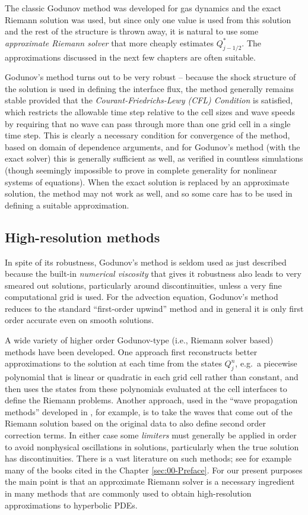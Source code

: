 \documentclass{SIAMbook2016}
\begin{document}
The classic Godunov method was developed for gas dynamics and the exact
Riemann solution was used, but since only one value is used from this
solution and the rest of the structure is thrown away, it is natural to
use some \emph{approximate Riemann solver} that more cheaply estimates
\(Q_{j-1/2}^*\). The approximations discussed in the next few chapters
are often suitable.

Godunov's method turns out to be very robust -- because the shock
structure of the solution is used in defining the interface flux, the
method generally remains stable provided that the
\emph{Courant-Friedrichs-Lewy (CFL) Condition} is satisfied, which
restricts the allowable time step relative to the cell sizes and wave
speeds by requiring that no wave can pass through more than one grid
cell in a single time step. This is clearly a necessary condition for
convergence of the method, based on domain of dependence arguments, and
for Godunov's method (with the exact solver) this is generally
sufficient as well, as verified in countless simulations (though
seemingly impossible to prove in complete generality for nonlinear
systems of equations). When the exact solution is replaced by an
approximate solution, the method may not work as well, and so some care
has to be used in defining a suitable approximation.

\hypertarget{high-resolution-methods}{%
\subsection{High-resolution methods}\label{high-resolution-methods}}

In spite of its robustness, Godunov's method is seldom used as just
described because the built-in \emph{numerical viscosity} that gives it
robustness also leads to very smeared out solutions, particularly around
discontinuities, unless a very fine computational grid is used. For the
advection equation, Godunov's method reduces to the standard
``first-order upwind'' method and in general it is only first order
accurate even on smooth solutions.

A wide variety of higher order Godunov-type (i.e., Riemann solver based)
methods have been developed. One approach first reconstructs better
approximations to the solution at each time from the states \(Q_j^n\),
e.g.~a piecewise polynomial that is linear or quadratic in each grid
cell rather than constant, and then uses the states from these
polynomials evaluated at the cell interfaces to define the Riemann
problems. Another approach, used in the ``wave propagation methods''
developed in \cite{fvmhp}, for example, is to take the waves that come
out of the Riemann solution based on the original data to also define
second order correction terms. In either case some \emph{limiters} must
generally be applied in order to avoid nonphysical oscillations in
solutions, particularly when the true solution has discontinuities.
There is a vast literature on such methods; see for example many of the
books cited in the Chapter \ref{sec:00-Preface}. For our present
purposes the main point is that an approximate Riemann solver is a
necessary ingredient in many methods that are commonly used to obtain
high-resolution approximations to hyperbolic PDEs.
\end{document}
